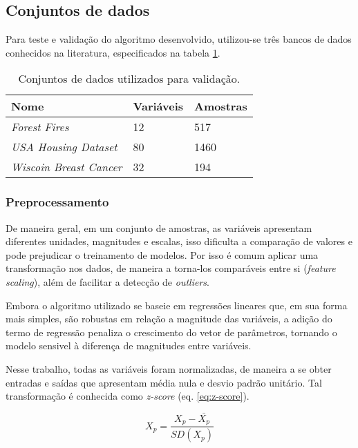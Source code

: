 \subsection{Conjuntos de dados}

Para teste e validação do algoritmo desenvolvido, utilizou-se três bancos de dados conhecidos na literatura, 
especificados na tabela \ref{tbl:datasets}.
\begin{table}[H]
    \caption{Conjuntos de dados utilizados para validação.}
    \centering
    \begin{tabular}{@{}lll@{}}
    \toprule
    Nome                           & Variáveis & Amostras \\ \midrule
    \textit{Forest Fires}          & 12        & 517      \\
    \textit{USA Housing Dataset}   & 80        & 1460     \\
    \textit{Wiscoin Breast Cancer} & 32        & 194      \\ \bottomrule
    \end{tabular}
    \label{tbl:datasets}
\end{table}

\subsubsection{Preprocessamento}

De maneira geral, em um conjunto de amostras, as variáveis apresentam diferentes unidades, magnitudes e escalas, 
isso dificulta a comparação de valores e pode prejudicar o treinamento de modelos. Por isso é comum aplicar uma 
transformação nos dados, de maneira a torna-los comparáveis entre si (\textit{feature scaling}), além de 
facilitar a detecção de \textit{outliers}.

Embora o algoritmo utilizado se baseie em regressões lineares que, em sua forma mais simples, são robustas em 
relação a magnitude das variáveis, a adição do termo de regressão penaliza o crescimento do vetor de parâmetros, 
tornando o modelo sensivel à diferença de magnitudes entre variáveis.

Nesse trabalho, todas as variáveis foram normalizadas, de maneira a se obter entradas e saídas que apresentam 
média nula e desvio padrão unitário. Tal transformação é conhecida como \textit{z-score} (eq. \ref{eq:z-score}).

\begin{equation}
    X_p = \frac{ X_p - \bar{X_p} }{SD(X_p)}
    \label{eq:z-score}
\end{equation}

